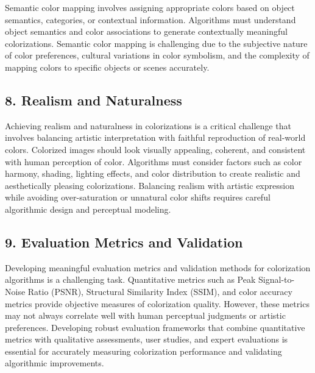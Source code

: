 Semantic color mapping involves assigning appropriate colors based on object semantics, categories, or contextual information. Algorithms must understand object semantics and color associations to generate contextually meaningful colorizations. Semantic color mapping is challenging due to the subjective nature of color preferences, cultural variations in color symbolism, and the complexity of mapping colors to specific objects or scenes accurately.

\subsection*{8. Realism and Naturalness}

Achieving realism and naturalness in colorizations is a critical challenge that involves balancing artistic interpretation with faithful reproduction of real-world colors. Colorized images should look visually appealing, coherent, and consistent with human perception of color. Algorithms must consider factors such as color harmony, shading, lighting effects, and color distribution to create realistic and aesthetically pleasing colorizations. Balancing realism with artistic expression while avoiding over-saturation or unnatural color shifts requires careful algorithmic design and perceptual modeling.

\subsection*{9. Evaluation Metrics and Validation}

Developing meaningful evaluation metrics and validation methods for colorization algorithms is a challenging task. Quantitative metrics such as Peak Signal-to-Noise Ratio (PSNR), Structural Similarity Index (SSIM), and color accuracy metrics provide objective measures of colorization quality. However, these metrics may not always correlate well with human perceptual judgments or artistic preferences. Developing robust evaluation frameworks that combine quantitative metrics with qualitative assessments, user studies, and expert evaluations is essential for accurately measuring colorization performance and validating algorithmic improvements.

